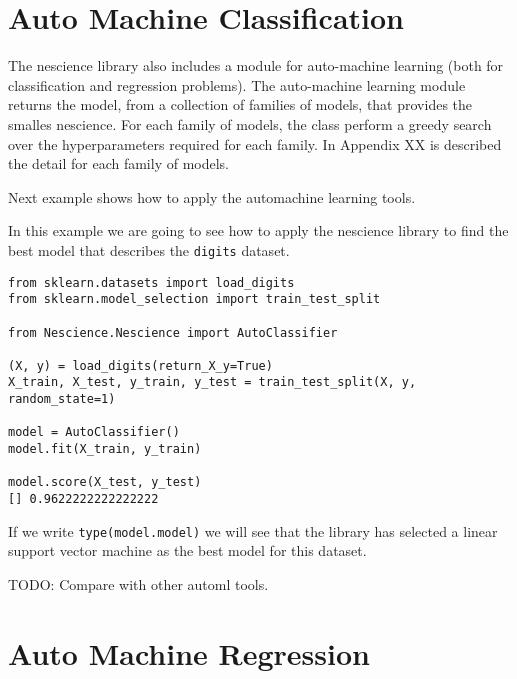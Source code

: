%
%

\section{Auto Machine Classification}

The nescience library also includes a module for auto-machine learning (both for classification and regression problems). The auto-machine learning module returns the model, from a collection of families of models, that provides the smalles nescience. For each family of models, the class perform a greedy search over the hyperparameters required for each family. In Appendix XX is described the detail for each family of models.

Next example shows how to apply the automachine learning tools.

\begin{example}
\label{ex:automl}

In this example we are going to see how to apply the nescience library to find the best model that describes the \texttt{digits} dataset.

\begin{sourcecode}
{\scriptsize \begin{verbatim}
from sklearn.datasets import load_digits
from sklearn.model_selection import train_test_split

from Nescience.Nescience import AutoClassifier

(X, y) = load_digits(return_X_y=True)
X_train, X_test, y_train, y_test = train_test_split(X, y, random_state=1)

model = AutoClassifier()
model.fit(X_train, y_train)

model.score(X_test, y_test)
[] 0.9622222222222222
\end{verbatim}}

If we write \texttt{type(model.model)} we will see that the library has selected a linear support vector machine as the best model for this dataset.

\end{sourcecode}
\end{example}

{\color{red} TODO: Compare with other automl tools.}

%
%

\section{Auto Machine Regression}


